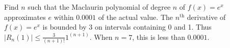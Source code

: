 {Find $n$ such that the  Maclaurin polynomial of degree $n$ of $f(x)= e^x$ approximates $e$ within $0.0001$ of the actual value.
}
{The $n^\text{th}$ derivative of $f(x)=e^x$ is bounded by $3$ on intervals containing $0$ and 1. Thus $|R_n(1)|\leq \frac{3}{(n+1)!}1^{(n+1)}$. When $n=7$, this is less than $0.0001$. 
}